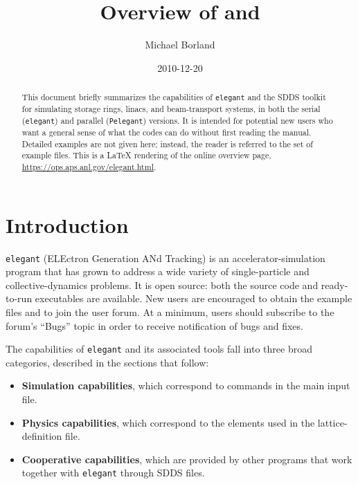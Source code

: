 \documentclass[11pt]{article}
\title{Overview of \elegant{} and \sdds{}}
\author{Michael Borland}
\date{2010-12-20}
\newcommand{\elegant}{\texttt{elegant}}
\newcommand{\sdds}{SDDS}
\begin{document}
\maketitle

\begin{abstract}
This document briefly summarizes the capabilities of \elegant{} and the
\sdds{} toolkit for simulating storage rings, linacs, and beam-transport
systems, in both the serial (\elegant{}) and parallel (\texttt{Pelegant})
versions. It is intended for potential new users who want a general sense of
what the codes can do without first reading the manual. Detailed examples are
not given here; instead, the reader is referred to the set of example files.
This is a LaTeX rendering of the online overview page,
\url{https://ops.aps.anl.gov/elegant.html}.
\end{abstract}

\section{Introduction}

\elegant{} (ELEctron Generation ANd Tracking) is an accelerator-simulation
program that has grown to address a wide variety of single-particle and
collective-dynamics problems. It is open source: both the source code and
ready-to-run executables are available. New users are encouraged to obtain the
example files and to join the user forum. At a minimum, users should subscribe
to the forum's ``Bugs'' topic in order to receive notification of bugs and
fixes.

The capabilities of \elegant{} and its associated tools fall into three broad
categories, described in the sections that follow:
\begin{itemize}[nosep]
  \item \textbf{Simulation capabilities}, which correspond to commands in the
        main input file.
  \item \textbf{Physics capabilities}, which correspond to the elements used in
        the lattice-definition file.
  \item \textbf{Cooperative capabilities}, which are provided by other programs
        that work together with \elegant{} through \sdds{} files.
\end{itemize}
\end{document}
